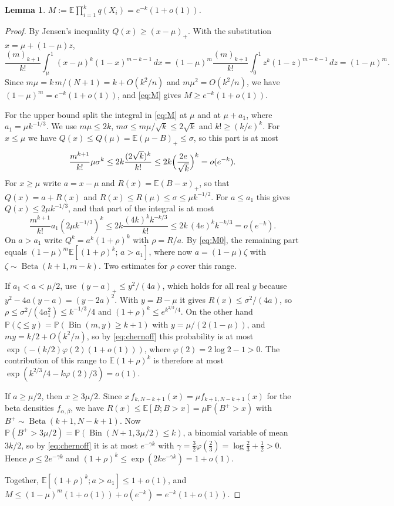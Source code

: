 \documentclass[11pt]{amsart}
\newtheorem{lemma}[theorem]{Lemma}
\theoremstyle{remark}
\numberwithin{equation}{section}
\newcommand{\E}{\mathbb E}
\newcommand{\Pp}{\mathbb P}
\newcommand{\Bin}{\operatorname{Bin}}
\newcommand{\Bet}{\operatorname{Beta}}
\newcommand{\1}{\mathbf 1}
\begin{document}
\begin{lemma}\label{lem:saddle}
$\displaystyle M:=\E\prod_{i=1}^kq(X_i)=e^{-k}(1+o(1))$.
\end{lemma}

\begin{proof}
By Jensen's inequality $Q(x)\ge(x-\mu)_+$. With the substitution $x=\mu+(1-\mu)z$,
\begin{equation}\label{eq:M0}
\frac{(m)_{k+1}}{k!}\int_\mu^1(x-\mu)^k(1-x)^{m-k-1}\,dx=(1-\mu)^m\frac{(m)_{k+1}}{k!}\int_0^1z^k(1-z)^{m-k-1}\,dz=(1-\mu)^m .
\end{equation}
Since $m\mu=k\,m/(N+1)=k+O(k^2/n)$ and $m\mu^2=O(k^2/n)$, we have $(1-\mu)^m=e^{-k}(1+o(1))$, and \eqref{eq:M} gives $M\ge e^{-k}(1+o(1))$.

For the upper bound split the integral in \eqref{eq:M} at $\mu$ and at $\mu+a_1$, where $a_1=\mu k^{-1/3}$. We use $m\mu\le2k$, $m\sigma\le m\mu/\sqrt k\le2\sqrt k$ and $k!\ge(k/e)^k$. For $x\le\mu$ we have $Q(x)\le Q(\mu)=\E(\mu-B)_+\le\sigma$, so this part is at most
\[
\frac{m^{k+1}}{k!}\mu\sigma^k\le2k\frac{(2\sqrt k)^k}{k!}\le2k\Bigl(\frac{2e}{\sqrt k}\Bigr)^k=o(e^{-k}).
\]
For $x\ge\mu$ write $a=x-\mu$ and $R(x)=\E(B-x)_+$, so that $Q(x)=a+R(x)$ and $R(x)\le R(\mu)\le\sigma\le\mu k^{-1/2}$. For $a\le a_1$ this gives $Q(x)\le2\mu k^{-1/3}$, and that part of the integral is at most
\[
\frac{m^{k+1}}{k!}a_1(2\mu k^{-1/3})^k\le2k\frac{(4k)^kk^{-k/3}}{k!}\le2k\,(4e)^kk^{-k/3}=o(e^{-k}).
\]
On $a>a_1$ write $Q^k=a^k(1+\rho)^k$ with $\rho=R/a$. By \eqref{eq:M0}, the remaining part equals $(1-\mu)^m\E[(1+\rho)^k;\,a>a_1]$, where now $a=(1-\mu)\zeta$ with $\zeta\sim\Bet(k+1,m-k)$. Two estimates for $\rho$ cover this range.

If $a_1<a<\mu/2$, use $(y-a)_+\le y^2/(4a)$, which holds for all real $y$ because $y^2-4a(y-a)=(y-2a)^2$. With $y=B-\mu$ it gives $R(x)\le\sigma^2/(4a)$, so $\rho\le\sigma^2/(4a_1^2)\le k^{-1/3}/4$ and $(1+\rho)^k\le e^{k^{2/3}/4}$. On the other hand $\Pp(\zeta\le y)=\Pp(\Bin(m,y)\ge k+1)$ with $y=\mu/(2(1-\mu))$, and $m y=k/2+O(k^2/n)$, so by \eqref{eq:chernoff} this probability is at most $\exp(-(k/2)\varphi(2)(1+o(1)))$, where $\varphi(2)=2\log2-1>0$. The contribution of this range to $\E(1+\rho)^k$ is therefore at most $\exp(k^{2/3}/4-k\varphi(2)/3)=o(1)$.

If $a\ge\mu/2$, then $x\ge3\mu/2$. Since $x\,f_{k,N-k+1}(x)=\mu f_{k+1,N-k+1}(x)$ for the beta densities $f_{\alpha,\beta}$, we have $R(x)\le\E[B;B>x]=\mu\Pp(B^+>x)$ with $B^+\sim\Bet(k+1,N-k+1)$. Now $\Pp(B^+>3\mu/2)=\Pp(\Bin(N+1,3\mu/2)\le k)$, a binomial variable of mean $3k/2$, so by \eqref{eq:chernoff} it is at most $e^{-\gamma k}$ with $\gamma=\tfrac32\varphi(\tfrac23)=\log\tfrac23+\tfrac12>0$. Hence $\rho\le2e^{-\gamma k}$ and $(1+\rho)^k\le\exp(2ke^{-\gamma k})=1+o(1)$.

Together, $\E[(1+\rho)^k;a>a_1]\le1+o(1)$, and $M\le(1-\mu)^m(1+o(1))+o(e^{-k})=e^{-k}(1+o(1))$.
\end{proof}
\end{document}
